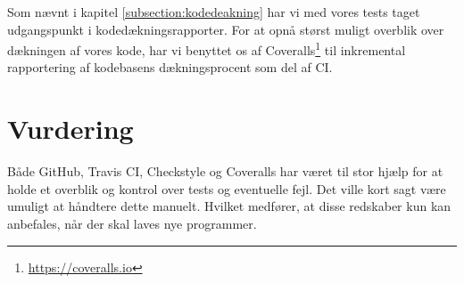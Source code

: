Som nævnt i kapitel \ref{subsection:kodedeakning} har vi med vores tests taget udgangspunkt i kodedækningsrapporter. For at opnå størst muligt overblik over dækningen af vores kode, har vi benyttet os af Coveralls\footnote{\url{https://coveralls.io}} til inkremental rapportering af kodebasens dækningsprocent som del af CI.

\section{Vurdering}

Både GitHub, Travis CI, Checkstyle og Coveralls har været til stor hjælp for at holde et overblik og kontrol over tests og eventuelle fejl. Det ville kort sagt være umuligt at håndtere dette manuelt. Hvilket medfører, at disse redskaber kun kan anbefales, når der skal laves nye programmer.
